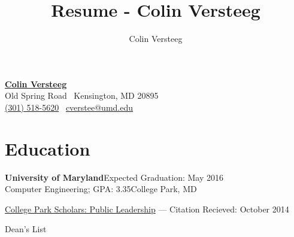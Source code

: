 \documentclass[letterpaper,12pt]{article}
\title{Resume - Colin Versteeg}
\author{Colin Versteeg}
\makeatletter
\def \myrespresectionskip {-.25in}
\newcommand{\myheader}{
\begin{center}
    \href{http://www.linkedin.com/pub/colin-versteeg/5b/26b/1b8}{{\huge\bf\sffamily Colin Versteeg}} \\
   \sffamily 9816 Old Spring Road \textbullet \, Kensington, MD 20895 \\ 
\href{callto:3015185620}{\sffamily(301) 518-5620} \textbullet \, \href{mailto:cverstee@umd.edu}{\sffamily cverstee@umd.edu} 
\end{center}
}
\newcommand{\resheading}[5]{
\normalsize{\textbf{#1}}\hfill{\rmfamily\normalsize\textcolor{faded}{#2}} \\
\normalsize{#3}\hfill{\textcolor{faded}{\normalsize#4}}\\
\normalsize{#5}
\normalsize
}
\makeatother
\begin{document}
\myheader
\vspace{-.3in}
\section*{Education}
\resheading{{University of Maryland}}{Expected Graduation: May 2016}{Computer Engineering; GPA: 3.35}{College Park, MD}{}\footnotesize
 \begin{resumeitemize}
	\vspace{-.2in}
            \item{\href{http://www.scholars.umd.edu/programs/pl}{College Park Scholars: Public Leadership} --- Citation Recieved: October 2014}
\item{Dean's List}
          \end{resumeitemize}

\vspace{\myrespresectionskip}
\end{document}
